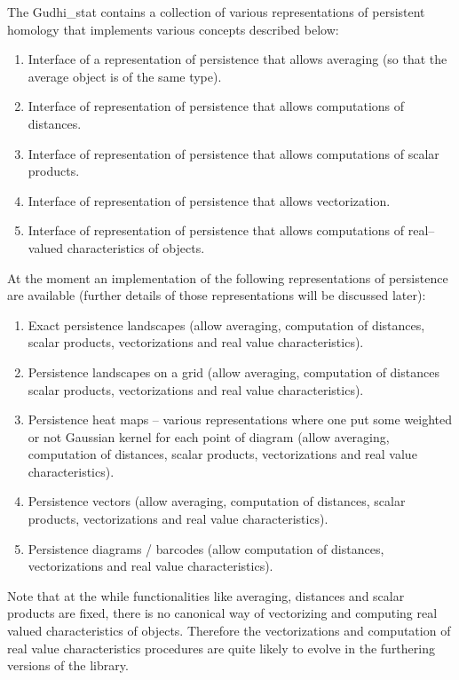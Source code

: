 \documentclass[11pt]{article}
\begin{document}
The Gudhi\_stat contains a collection of various representations of persistent homology that implements various concepts described below:
\begin{enumerate}
\item Interface of a representation of persistence that allows averaging (so that the average object is of the same type).
\item Interface of representation of persistence that allows computations of distances.
\item Interface of representation of persistence that allows computations of scalar products.
\item Interface of representation of persistence that allows vectorization.
\item Interface of representation of persistence that allows computations of real--valued characteristics of objects.
\end{enumerate}

At the moment an implementation of the following representations of persistence are available (further details of those representations will be discussed later):
\begin{enumerate}
\item Exact persistence landscapes (allow averaging, computation of distances, scalar products, vectorizations and real value characteristics).
\item Persistence landscapes on a grid (allow averaging, computation of distances scalar products, vectorizations and real value characteristics).
\item Persistence heat maps – various representations where one put some weighted or not Gaussian kernel for each point of diagram (allow averaging, computation of distances, scalar products, vectorizations and real value characteristics).
\item Persistence vectors (allow averaging, computation of distances, scalar products, vectorizations and real value characteristics).
\item Persistence diagrams / barcodes (allow computation of distances, vectorizations and real value characteristics).
\end{enumerate}

Note that at the while functionalities like averaging, distances and scalar products are fixed, there is no canonical way of vectorizing and computing real valued characteristics of objects. Therefore the vectorizations and computation of real value characteristics procedures are quite likely to evolve in the furthering versions of the library. 
\end{document}
